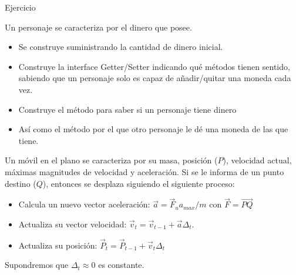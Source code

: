 \documentclass[10pt,envcountsect,spanish]{beamer}
\begin{document}
\begin{frame}[fragile]{Ejercicio} 

\small 
\begin{ejercicio}{}
Un personaje se caracteriza por el dinero que posee.

\begin{itemize}[leftmargin=.2in, rightmargin=0in]\setlength{\itemsep}{0mm} \small 
\item Se construye suministrando la cantidad de dinero inicial.
\item Construye la interface Getter/Setter indicando qué métodos tienen sentido, sabiendo que un personaje solo es capaz de añadir/quitar una moneda cada vez.
\item Construye  el método para saber si un personaje tiene dinero
\item Así como el método por el que otro personaje le dé una moneda de las que tiene.
\end{itemize}
\end{ejercicio} 


\begin{ejercicio}{}
Un móvil en el plano se caracteriza por su masa, posición ($P$), velocidad actual, máximas magnitudes de velocidad y aceleración. Si se le informa de un punto destino ($Q$), entonces se desplaza siguiendo el siguiente proceso:
\begin{itemize}[leftmargin=0.2in, rightmargin=-.3in]\setlength{\itemsep}{0mm} \small 
\item Calcula un nuevo vector aceleración: $\vec{a}=\vec{F}_u a_{max} / m$ con $\vec{F}=\vec{PQ}$
\item Actualiza su vector velocidad: $\vec{v}_t=\vec{v}_{t-1} + \vec{a} \Delta_t$.
\item Actualiza su posición:  $\vec{P}_t=\vec{P}_{t-1} + \vec{v}_t \Delta_t$
\end{itemize}
Supondremos que $\Delta_t\approx 0$ es constante.
\end{ejercicio} 


%
%
%
%

\end{frame}
\end{document}
